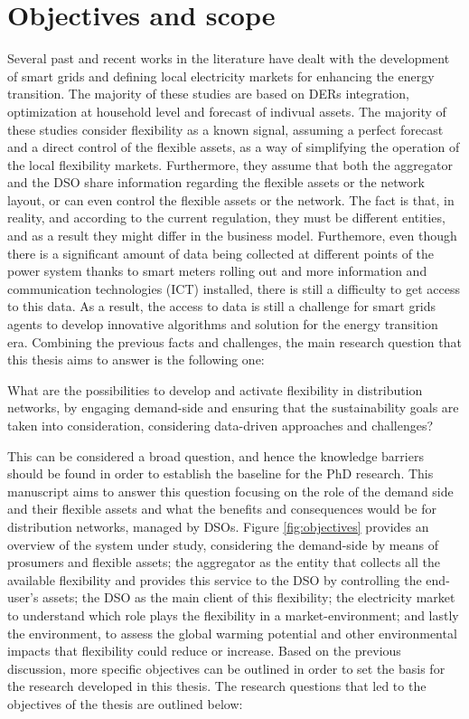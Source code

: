 \section{Objectives and scope}
Several past and recent works in the literature have dealt with the development of smart grids and defining local electricity markets for enhancing the energy transition. The majority of these studies are based on DERs integration, optimization at household level and forecast of indivual assets. The majority of these studies consider flexibility as a known signal, assuming a perfect forecast and a direct control of the flexible assets, as a way of simplifying the operation of the local flexibility markets. Furthermore, they assume that both the aggregator and the DSO share information regarding the flexible assets or the network layout, or can even control the flexible assets or the network. The fact is that, in reality, and according to the current regulation, they must be different entities, and as a result they might differ in the business model. Furthemore, even though there is a significant amount of data being collected at different points of the power system thanks to smart meters rolling out and more information and communication technologies (ICT) installed, there is still a difficulty to get access to this data. As a result, the access to data is still a challenge for smart grids agents to develop innovative algorithms and solution for the energy transition era. Combining the previous facts and challenges, the main research question that this thesis aims to answer is the following one:

\begin{tcolorbox}
What are the possibilities to develop and activate flexibility in distribution networks, by engaging demand-side and ensuring that the sustainability goals are taken into consideration, considering data-driven approaches and challenges? 
\end{tcolorbox}

This can be considered a broad question, and hence the knowledge barriers should be found in order to establish the baseline for the PhD research. This manuscript aims to answer this question focusing on the role of the demand side and their flexible assets and what the benefits and consequences would be for distribution networks, managed by DSOs. Figure \ref{fig:objectives} provides an overview of the system under study, considering the demand-side by means of prosumers and flexible assets; the aggregator as the entity that collects all the available flexibility and provides this service to the DSO by controlling the end-user's assets; the DSO as the main client of this flexibility; the electricity market to understand which role plays the flexibility in a market-environment; and lastly the environment, to assess the global warming potential and other environmental impacts that flexibility could reduce or increase. Based on the previous discussion, more specific objectives can be outlined in order to set the basis for the research developed in this thesis. The research questions that led to the objectives of the thesis are outlined below: 

